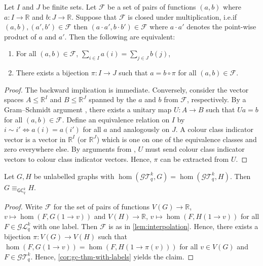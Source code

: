 \documentclass[a4paper,UKenglish,cleveref, autoref, thm-restate]{lipics-v2021}
\newcommand{\Ekq}{\ensuremath{\mathcal{T}_{q}^{k}}}
\newcommand{\Lkq}{\ensuremath{\mathcal{L}_{q}^{k}}}
\newcommand{\GEkq}{\ensuremath{\mathcal{G}\Lkq}}
\newcommand{\GEkqLL}{\ensuremath{\mathcal{G}\Ekq}}
\newcommand{\lGC}{\ensuremath{\mathsf{GC}}}
\begin{document}
\begin{lemma}[Folklore] \label{lem:interpolation}
	Let $I$ and $J$ be finite sets.
	Let $\mathcal{F}$ be a set of pairs of functions $(a, b)$ where $a \colon I \to \mathbb{R}$ and $b \colon J \to \mathbb{R}$.
	Suppose that $\mathcal{F}$ is closed under multiplication, i.e.\@ if $(a, b), (a', b') \in \mathcal{F}$ then $(a \cdot a', b \cdot b') \in \mathcal{F}$ where $a \cdot a'$ denotes the point-wise product of $a$ and $a'$.
	Then the following are equivalent:
	\begin{enumerate}
		\item For all $(a, b) \in \mathcal{F}$, $\sum_{i \in I} a(i) = \sum_{j \in J} b(j)$,
		\item There exists a bijection $\pi \colon I \to J$ such that $a = b \circ \pi$ for all $(a,b) \in \mathcal{F}$.
	\end{enumerate}
\end{lemma}
\begin{proof}
	The backward implication is immediate.
	Conversely, consider the vector spaces $A \leq \mathbb{R}^I$ and $B \leq \mathbb{R}^J$ spanned by the $a$ and $b$ from $\mathcal{F}$, respectively. By a Gram--Schmidt argument \cite[Lemma~29]{grohe_homomorphism_2021_arxiv}, there exists a unitary map $U \colon A \to B$ such that $Ua = b$ for all $(a,b) \in \mathcal{F}$.
	Define an equivalence relation on $I$ by $i  \sim i' \iff a(i) = a(i')$ for all $a$ and analogously on $J$. A colour class indicator vector is a vector in $\mathbb{R}^I$ (or $\mathbb{R}^J$) which is one on one of the equivalence classes and zero everywhere else.
	By arguments from \cite[Lemma~35]{grohe_homomorphism_2021_arxiv}, $U$ must send colour class indicator vectors to colour class indicator vectors. Hence, $\pi$ can be extracted from $U$.
\end{proof}

\begin{lemma}\label{lem:labelsBw}
  Let $G, H$ be unlabelled graphs with $\hom(\GEkqLL, G) = \hom(\GEkqLL, H)$. Then $G \equiv_{\lGC^k_q} H$.
\end{lemma}
\begin{proof}
	Write $\mathcal{F} $ for the set of pairs of functions $V(G) \to \mathbb{R}$, $v \mapsto \hom(F, G(1 \to v))$ and $V(H) \to \mathbb{R}$, $v \mapsto \hom(F, H(1 \to v))$ for all $F \in \GEkq$ with one label. Then $\mathcal{F}$ is as in \cref{lem:interpolation}. Hence, there exists a bijection $\pi \colon V(G) \to V(H)$ such that $\hom(F, G(1 \to v)) = \hom(F, H(1 \to \pi(v)))$ for all $v \in V(G)$ and $F \in \GEkqLL$. Hence, \cref{cor:gc-thm-with-labels} yields the claim.
\end{proof}
\end{document}
